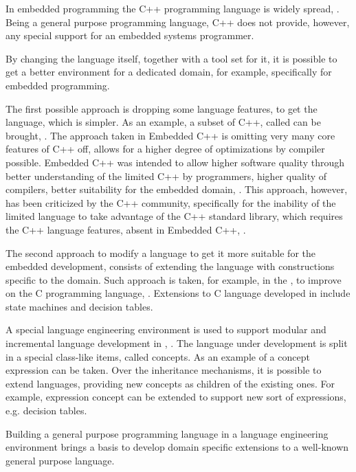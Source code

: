 

In embedded programming the C++ programming language is widely spread, \cite{embedlangs}. Being a general purpose 
programming language, C++ does not provide, however, any special support for an embedded systems programmer. 

By changing  the language itself, together with a tool set for it, it is possible to get a better environment 
for a dedicated domain, for example, specifically for embedded programming. 

The first possible approach is dropping some language features, to get the language, which is simpler. 
As an example, a subset of C++, called  can be brought, \cite{emcpp}. The approach taken in Embedded C++ is 
omitting very many core features of C++ off, allows for a higher degree of optimizations by compiler possible. 
Embedded C++ was intended to allow higher software quality through better understanding of the limited 
C++ by programmers, higher quality of compilers, better suitability for the embedded domain, \cite{stripepp}. 
This approach, however, has been criticized by the C++ community, specifically for the inability of the 
limited language to take advantage of the C++ standard library, which requires the C++ language features, absent in 
Embedded C++, \cite{stremcpp}.

The second approach to modify a language to get it more suitable for the embedded development, consists of extending 
the language with constructions specific to the domain. Such approach is taken, for example, in the , to improve on
the C programming language, \cite{2012_voelter_mbeddr_extensible_c_based_language_and_ide_for_embedded}. 
Extensions to C language developed in  include state machines and decision tables.

A special language engineering environment is used to support modular and incremental language development in , 
. The language under development is split in a special class-like items, called \glspl{concept}. As an example of a concept expression 
can be taken. Over the inheritance mechanisms, it is possible to extend languages, providing new concepts as children of the existing ones.
For example, expression concept can be extended to support new sort of expressions, e.g. decision tables.

Building a general purpose programming language in a language engineering environment brings a basis to 
develop domain specific extensions to a well-known general purpose language.

